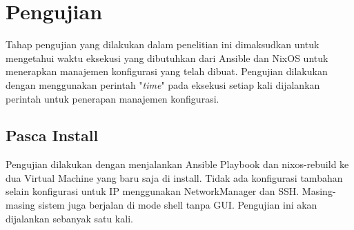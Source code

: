 \documentclass[10pt,]{report}
\begin{document}
\section{Pengujian}
\begin{adjustwidth}{20pt}{}
	\hspace\parindent
	Tahap pengujian yang dilakukan dalam penelitian ini dimaksudkan untuk mengetahui
	waktu eksekusi yang dibutuhkan dari Ansible dan NixOS untuk menerapkan manajemen
	konfigurasi yang telah dibuat. Pengujian dilakukan dengan menggunakan perintah
	"\textit{time}" pada eksekusi setiap kali dijalankan perintah untuk penerapan manajemen
	konfigurasi.
	\subsection{Pasca Install}
	\begin{adjustwidth}{20pt}{}
		Pengujian dilakukan dengan menjalankan Ansible Playbook dan nixos-rebuild
		ke dua Virtual Machine yang baru saja di install. Tidak ada konfigurasi
		tambahan selain konfigurasi untuk IP menggunakan NetworkManager dan SSH.
		Masing-masing sistem juga berjalan di mode shell tanpa GUI. Pengujian ini
		akan dijalankan sebanyak satu kali.
	\end{adjustwidth}


\end{adjustwidth}
\end{document}
